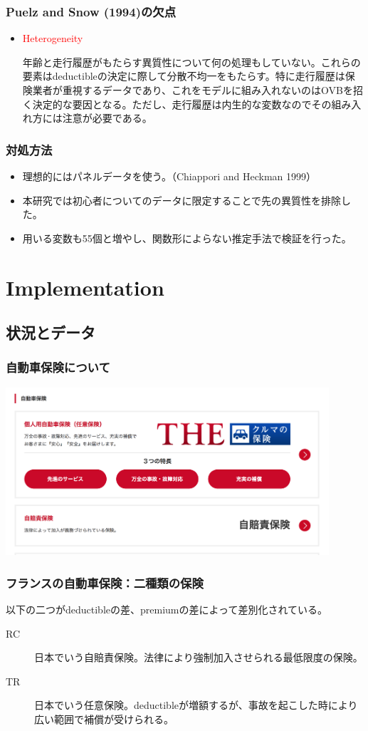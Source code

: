 \documentclass[dvipdfmx, 12pt]{beamer}
\begin{document}
\begin{frame}\frametitle{Puelz and Snow (1994)の欠点}
	\begin{itemize}
	\item \textcolor{red}{Heterogeneity}
	
	年齢と走行履歴がもたらす異質性について何の処理もしていない。これらの要素はdeductibleの決定に際して分散不均一をもたらす。特に走行履歴は保険業者が重視するデータであり、これをモデルに組み入れないのはOVBを招く決定的な要因となる。ただし、走行履歴は内生的な変数なのでその組み入れ方には注意が必要である。
	\end{itemize}
\end{frame}

\begin{frame}\frametitle{対処方法}
	\begin{itemize}
	\item 理想的にはパネルデータを使う。（Chiappori and Heckman 1999）
	\item 本研究では初心者についてのデータに限定することで先の異質性を排除した。
	\item 用いる変数も55個と増やし、関数形によらない推定手法で検証を行った。
	\end{itemize}
\end{frame}


\section{Implementation}
\subsection{状況とデータ}
\begin{frame}\frametitle{自動車保険について}
\centering
        \includegraphics[width = 12cm]{ins.png}
\end{frame}

\begin{frame}\frametitle{フランスの自動車保険：二種類の保険}
以下の二つがdeductibleの差、premiumの差によって差別化されている。

	\begin{description}
	\item[RC] 日本でいう自賠責保険。法律により強制加入させられる最低限度の保険。
	\item[TR] 日本でいう任意保険。deductibleが増額するが、事故を起こした時により広い範囲で補償が受けられる。
	\end{description}
\end{frame}
\end{document}
